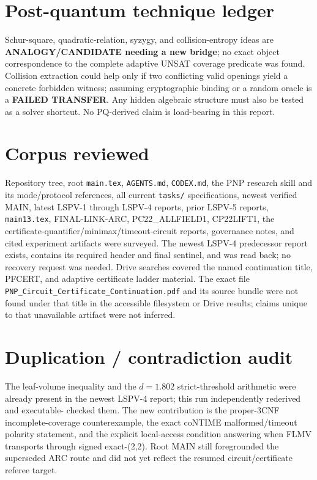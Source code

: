 \documentclass[11pt]{article}
\begin{document}
\section*{Post-quantum technique ledger}
Schur-square, quadratic-relation, syzygy, and collision-entropy ideas are
\textbf{ANALOGY/CANDIDATE needing a new bridge}; no exact object correspondence to the
complete adaptive UNSAT coverage predicate was found.  Collision extraction could help
only if two conflicting valid openings yield a concrete forbidden witness; assuming
cryptographic binding or a random oracle is a \textbf{FAILED TRANSFER}.  Any hidden
algebraic structure must also be tested as a solver shortcut.  No PQ-derived claim is
load-bearing in this report.

\section*{Corpus reviewed}
Repository tree, root \texttt{main.tex}, \texttt{AGENTS.md}, \texttt{CODEX.md}, the
PNP research skill and its mode/protocol references, all current \texttt{tasks/}
specifications, newest verified MAIN, latest LSPV-1 through LSPV-4 reports, prior LSPV-5
reports, \texttt{main13.tex}, FINAL-LINK-ARC, PC22\_ALLFIELD1, CP22LIFT1,
the certificate-quantifier/minimax/timeout-circuit reports, governance notes, and cited
experiment artifacts were surveyed.  The newest LSPV-4 predecessor report exists,
contains its required header and final sentinel, and was read back; no recovery request
was needed.  Drive searches covered the named continuation title, PFCERT, and adaptive
certificate ladder material.  The exact file
\texttt{PNP\_Circuit\_Certificate\_Continuation.pdf} and its source bundle were not
found under that title in the accessible filesystem or Drive results; claims unique to
that unavailable artifact were not inferred.

\section*{Duplication / contradiction audit}
The leaf-volume inequality and the $d=1.802$ strict-threshold arithmetic were already
present in the newest LSPV-4 report; this run independently rederived and executable-
checked them.  The new contribution is the proper-3CNF incomplete-coverage
counterexample, the exact coNTIME malformed/timeout polarity statement, and the
explicit local-access condition answering when FLMV transports through signed
exact-(2,2).  Root MAIN still foregrounded the superseded ARC route and did not yet
reflect the resumed circuit/certificate referee target.
\end{document}
